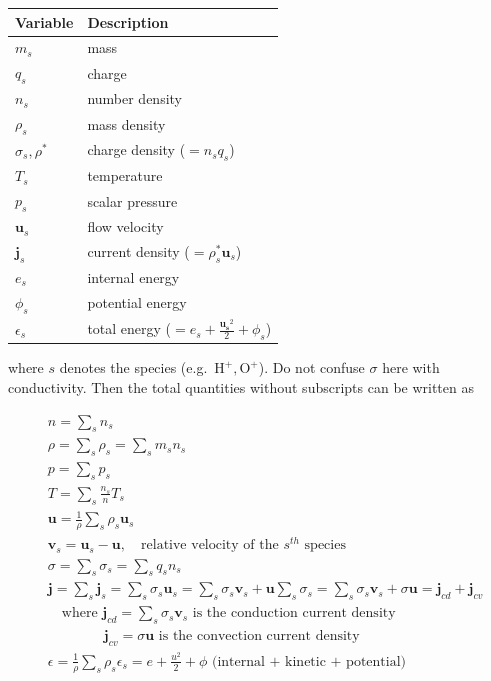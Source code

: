 \documentclass[
  notoc %
]{tufte-book}
\begin{document}
\begin{longtable}[]{@{}ll@{}}
\toprule
Variable & Description \\
\midrule
\endhead
\(m_s\) & mass \\
\(q_s\) & charge \\
\(n_s\) & number density \\
\(\rho_s\) & mass density \\
\(\sigma_s, \rho^\ast\) & charge density (\(=n_s q_s\)) \\
\(T_s\) & temperature \\
\(p_s\) & scalar pressure \\
\(\mathbf{u}_s\) & flow velocity \\
\(\mathbf{j}_s\) & current density (\(=\rho_s^\ast \mathbf{u}_s\)) \\
\(e_s\) & internal energy \\
\(\phi_s\) & potential energy \\
\(\epsilon_s\) & total energy
(\(=e_s+\frac{\mathbf{u_s}^2}{2}+\phi_s\)) \\
\bottomrule
\end{longtable}

where \(s\) denotes the species (e.g.~\(\text{H}^+, \text{O}^+\)). Do
not confuse \(\sigma\) here with conductivity. Then the total quantities
without subscripts can be written as

\[
\begin{aligned}
&n=\sum_s{n_s} \\
&\rho=\sum_{s}\rho_s=\sum_{s}{m_s n_s} \\
&p=\sum_s{p_s} \\
&T=\sum_s{\frac{n_s}{n}T_s} \\
&\mathbf{u}=\frac{1}{\rho}\sum_s \rho_s \mathbf{u}_s \\
&\mathbf{v}_s=\mathbf{u}_s -\mathbf{u},\quad \text{relative velocity of the } s^{th} \text{ species} \\
&\sigma = \sum_s{\sigma_s}=\sum_s{q_s n_s} \\
&\mathbf{j}=\sum_s{\mathbf{j}_s}=\sum_s{\sigma_s \mathbf{u}_s}=\sum_s{\sigma_s}\mathbf{v}_s+\mathbf{u}\sum_s{\sigma_s}=\sum_s{\sigma_s \mathbf{v}_s}+\sigma\mathbf{u}=\mathbf{j}_{cd}+ \mathbf{j}_{cv} \\
&\quad \text{where } \mathbf{j}_{cd}=\sum_s{\sigma_s}\mathbf{v}_s \text{ is the conduction current density} \\
&\quad \quad \quad \quad\mathbf{j}_{cv}=\sigma \mathbf{u} \text{ is the convection current density} \\
&\epsilon=\frac{1}{\rho}\sum_s{\rho_s\epsilon_s}=e+\frac{u^2}{2}+\phi \text{ (internal + kinetic + potential)}
\end{aligned}
\]
\end{document}
